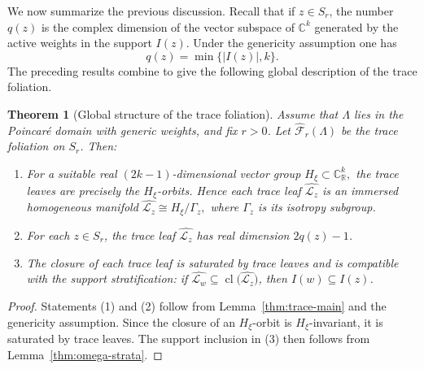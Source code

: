 \documentclass[11pt]{amsart}
\newtheorem{theorem}{Theorem}[section]
\theoremstyle{definition}
\theoremstyle{remark}
\newcommand{\C}{\mathbb{C}}
\newcommand{\R}{\mathbb{R}}
\newcommand{\leaf}[1]{\mathcal{L}_{#1}}
\begin{document}
We now summarize the previous discussion.
Recall that if  $z\in S_r$, the number $q(z)$ is the complex dimension of the vector subspace of $\C^k$ generated by the active weights in the support $I(z)$.
%
Under the genericity assumption one has
$$
	q(z)=\min\{|I(z)|,k\}.
$$
The preceding results combine to give the following global description of the trace foliation.
\begin{theorem}[Global structure of the trace foliation]
	Assume that $\Lambda$ lies in the Poincaré domain with generic weights, and fix $r>0$.
	Let $\widehat{\mathcal F}_r(\Lambda)$ be the trace foliation on $S_r$.
	Then:

	\begin{enumerate}
		\item For a suitable real $(2k-1)$-dimensional vector group
		      $
			      H_\xi\subset \C^k_{\R},
		      $
		      the trace leaves are precisely the $H_\xi$-orbits.
		      Hence each trace leaf $\widehat{\leaf{z}}$ is an immersed homogeneous manifold
		      $
			      \widehat{\leaf{z}}\cong H_\xi/\Gamma_z,
		      $
		      where $\Gamma_z$ is its isotropy subgroup.

		\item For each $z\in S_r$, the trace leaf $\widehat{\leaf{z}}$ has real dimension $2q(z)-1$.



\item The closure of each trace leaf is saturated by trace leaves and is compatible with the support stratification: if $\widehat{\leaf{w}}\subseteq \operatorname{cl}\bigl(\widehat{\leaf{z}}\bigr)$, then $I(w)\subseteq I(z)$.

	\end{enumerate}
\end{theorem}

\begin{proof}
	Statements (1) and (2) follow from Lemma~\ref{thm:trace-main} and the genericity assumption.
	Since the closure of an $H_\xi$-orbit is $H_\xi$-invariant, it is saturated by trace leaves.
	The support inclusion in (3) then follows from Lemma~\ref{thm:omega-strata}.
\end{proof}
\end{document}
